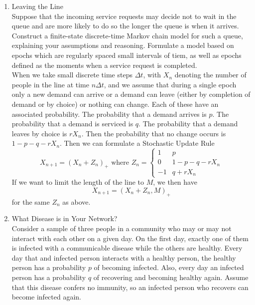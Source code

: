 \documentclass[12pt]{article}
\numberwithin{equation}{section}
\begin{document}
\begin{enumerate}
\begin{enumerate}
\end{enumerate}

\item Leaving the Line\\

Suppose that the incoming service requests may decide not to wait in the queue and are more likely to do so the longer the queue is when it arrives. Construct a finite-state discrete-time Markov chain model for such a queue, explaining your assumptions and reasoning. Formulate a model based on epochs which are regularly spaced small intervals of tiem, as well as epochs defined as the moments when a service request is completed.\\

When we take small discrete time steps $\Delta t$, with $X_n$ denoting the number of people in the line at time $n\Delta t$, and we assume that during a single epoch only a new demand can arrive or a demand can leave (either by completion of demand or by choice) or nothing can change. Each of these have an associated probability. The probability that a demand arrives is $p$. The probability that a demand is serviced is $q$. The probability that a demand leaves by choice is $rX_n$. Then the probability that no change occurs is $1-p-q-rX_n$. Then we can formulate a Stochastic Update Rule
$$X_{n+1}=(X_n+Z_n)_+ \text{ where } Z_n=\left\{\begin{array}{cc}1&p\\0&1-p-q-rX_n\\-1&q+rX_n\end{array}\right.$$
If we want to limit the length of the line to $M$, we then have
$$X_{n+1}=(X_n+Z_n,M)_+$$
for the same $Z_n$ as above.

\item What Disease is in Your Network?\\

Consider a sample of three people in a community who may or may not interact with each other on a given day. On the first day, exactly one of them is infected with a communicable disease while the others are healthy. Every day that and infected person interacts with a healthy person, the healthy person has a probability $p$ of becoming infected. Also, every day an infected person has a probability $q$ of recovering and becoming healthy again. Assume that this disease confers no immunity, so an infected person who recovers can become infected again.\\


\end{enumerate}
\end{document}
